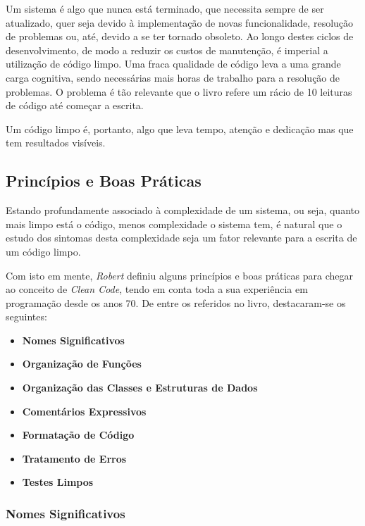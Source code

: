 \documentclass[10pt,portuguese]{article}
\begin{document}
\par Um sistema é algo que nunca está terminado, que necessita sempre de ser atualizado, quer seja devido à implementação de novas funcionalidade, resolução de problemas ou, até, devido a se ter tornado obsoleto. Ao longo destes ciclos de desenvolvimento, de modo a reduzir os custos de manutenção, é imperial a utilização de código limpo. Uma fraca qualidade de código leva a uma grande carga cognitiva, sendo necessárias mais horas de trabalho para a resolução de problemas. O problema 
é tão relevante que o livro refere um rácio de 10 leituras de código até começar a escrita.

\par Um código limpo é, portanto, algo que leva tempo, atenção e dedicação mas que tem resultados visíveis.

\subsection{Princípios e Boas Práticas}

\par Estando profundamente associado à complexidade de um sistema, ou seja, quanto mais limpo está o código, menos complexidade o sistema tem, é natural que o estudo dos sintomas desta complexidade seja um fator relevante para a escrita de um código limpo. 

\par Com isto em mente, \textit{Robert} definiu alguns princípios e boas práticas para chegar ao conceito de \textit{Clean Code}, tendo em conta toda a sua experiência em programação desde os anos 70.  De entre os referidos no livro, destacaram-se os seguintes:

\begin{itemize}
    \item \textbf{Nomes Significativos}
    \item \textbf{Organização de Funções}
    \item \textbf{Organização das Classes e Estruturas de Dados}
    \item \textbf{Comentários Expressivos}
    \item \textbf{Formatação de Código}
    \item \textbf{Tratamento de Erros}
    \item \textbf{Testes Limpos}
\end{itemize}

\subsubsection{Nomes Significativos}
\end{document}
